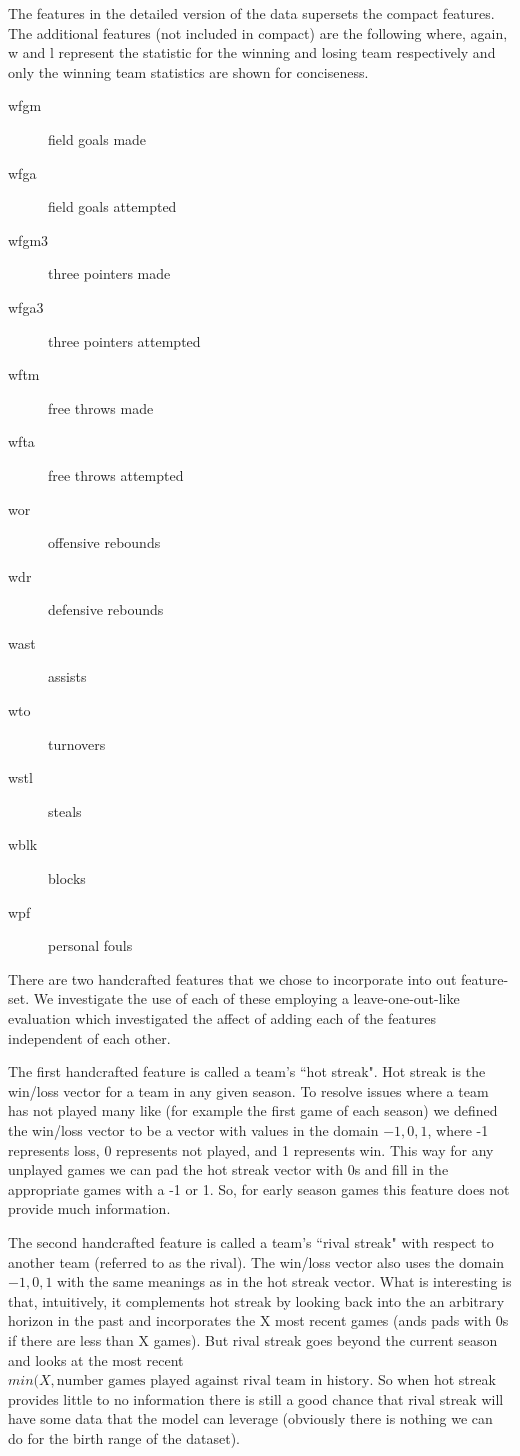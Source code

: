 \documentclass{article} %
\begin{document}
\label{sec:data-winner-features-detailed}
The features in the detailed version of the data supersets the compact features.  The additional features (not included in compact) are the following where, again, w and l represent the statistic for the winning and losing team respectively and only the winning team statistics are shown for conciseness.

\begin{description}
\item[wfgm] field goals made
\item[wfga] field goals attempted
\item[wfgm3] three pointers made
\item[wfga3] three pointers attempted
\item[wftm] free throws made
\item[wfta] free throws attempted
\item[wor] offensive rebounds
\item[wdr] defensive rebounds
\item[wast] assists
\item[wto] turnovers
\item[wstl] steals
\item[wblk] blocks
\item[wpf] personal fouls
\end{description}


\label{sec:data-winner-features-handcrafted}

There are two handcrafted features that we chose to incorporate into out feature-set.  We investigate the use of each of these employing a leave-one-out-like evaluation which investigated the affect of adding each of the features independent of each other.

The first handcrafted feature is called a team's ``hot streak".  Hot streak is the win/loss vector for a team in any given season.  To resolve issues where a team has not played many like (for example the first game of each season) we defined the win/loss vector to be a vector with values in the domain ${-1, 0, 1}$, where -1 represents loss, 0 represents not played, and 1 represents win.  This way for any unplayed games we can pad the hot streak vector with 0s and fill in the appropriate games with a -1 or 1.  So, for early season games this feature does not provide much information.

The second handcrafted feature is called a team's ``rival streak" with respect to another team (referred to as the rival). The win/loss vector also uses the domain ${-1, 0, 1}$ with the same meanings as in the hot streak vector.  What is interesting is that, intuitively, it complements hot streak by looking back into the an arbitrary horizon in the past and incorporates the X most recent games (ands pads with 0s if there are less than X games).  But rival streak goes beyond the current season and looks at the most recent $min(X, \text{number games played against rival team in history}$.  So when hot streak provides little to no information there is still a good chance that rival streak will have some data that the model can leverage (obviously there is nothing we can do for the birth range of the dataset).
\end{document}
